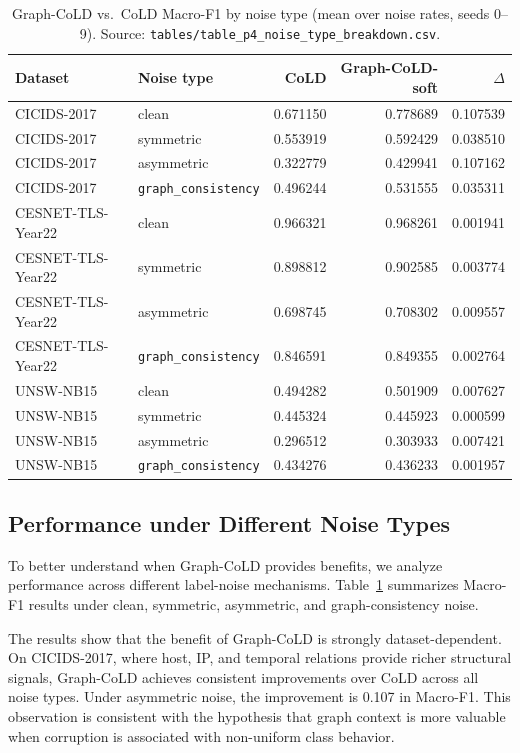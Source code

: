 \documentclass[preprint,3p,times]{elsarticle}
\begin{document}
\begin{table}[t]
\centering
\caption{Graph-CoLD vs.\ CoLD Macro-F1 by noise type (mean over noise rates,
seeds 0--9). Source: \texttt{tables/table\_p4\_noise\_type\_breakdown.csv}.}
\label{tab:noisetype}
\small
\begin{tabular}{llrrr}
\toprule
Dataset & Noise type & CoLD & Graph-CoLD-soft & $\Delta$ \\
\midrule
CICIDS-2017 & clean & 0.671150 & 0.778689 & 0.107539 \\
CICIDS-2017 & symmetric & 0.553919 & 0.592429 & 0.038510 \\
CICIDS-2017 & asymmetric & 0.322779 & 0.429941 & 0.107162 \\
CICIDS-2017 & \texttt{graph\_consistency} & 0.496244 & 0.531555 & 0.035311 \\
\midrule
CESNET-TLS-Year22 & clean & 0.966321 & 0.968261 & 0.001941 \\
CESNET-TLS-Year22 & symmetric & 0.898812 & 0.902585 & 0.003774 \\
CESNET-TLS-Year22 & asymmetric & 0.698745 & 0.708302 & 0.009557 \\
CESNET-TLS-Year22 & \texttt{graph\_consistency} & 0.846591 & 0.849355 & 0.002764 \\
\midrule
UNSW-NB15 & clean & 0.494282 & 0.501909 & 0.007627 \\
UNSW-NB15 & symmetric & 0.445324 & 0.445923 & 0.000599 \\
UNSW-NB15 & asymmetric & 0.296512 & 0.303933 & 0.007421 \\
UNSW-NB15 & \texttt{graph\_consistency} & 0.434276 & 0.436233 & 0.001957 \\
\bottomrule
\end{tabular}
\end{table}

\subsection{Performance under Different Noise Types}

To better understand when Graph-CoLD provides benefits, we analyze performance
across different label-noise mechanisms. Table~\ref{tab:noisetype} summarizes
Macro-F1 results under clean, symmetric, asymmetric, and graph-consistency
noise.

The results show that the benefit of Graph-CoLD is strongly dataset-dependent.
On CICIDS-2017, where host, IP, and temporal relations provide richer structural
signals, Graph-CoLD achieves consistent improvements over CoLD across all noise
types. Under asymmetric noise, the improvement is 0.107 in Macro-F1. This
observation is consistent with the hypothesis that graph context is more
valuable when corruption is associated with non-uniform class behavior.
\end{document}

